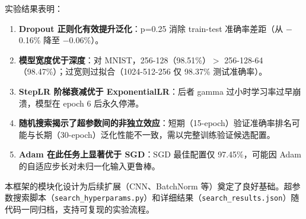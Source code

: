 \documentclass[12pt,a4paper]{ctexart}
\begin{document}
实验结果表明：

\begin{enumerate}
    \item \textbf{Dropout 正则化有效提升泛化}：p=0.25 消除 train-test 准确率差距（从 $-$0.16\% 降至 $-$0.06\%）。
    \item \textbf{模型宽度优于深度}：对 MNIST，256-128（98.51\%）$>$ 256-128-64（98.47\%）；过宽则过拟合（1024-512-256 仅 98.37\% 测试准确率）。
    \item \textbf{StepLR 阶梯衰减优于 ExponentialLR}：后者 gamma 过小时学习率过早崩溃，模型在 epoch 6 后永久停滞。
    \item \textbf{随机搜索揭示了超参数间的非独立效应}：短期（15-epoch）验证准确率排名可能与长期（30-epoch）泛化性能不一致，需以完整训练验证候选配置。
    \item \textbf{Adam 在此任务上显著优于 SGD}：SGD 最佳配置仅 97.45\%，可能因 Adam 的自适应步长对未归一化输入更鲁棒。
\end{enumerate}

本框架的模块化设计为后续扩展（CNN、BatchNorm 等）奠定了良好基础。超参数搜索脚本（\texttt{search\_hyperparams.py}）和详细结果（\texttt{search\_results.json}）随代码一同归档，支持可复现的实验流程。
\end{document}
